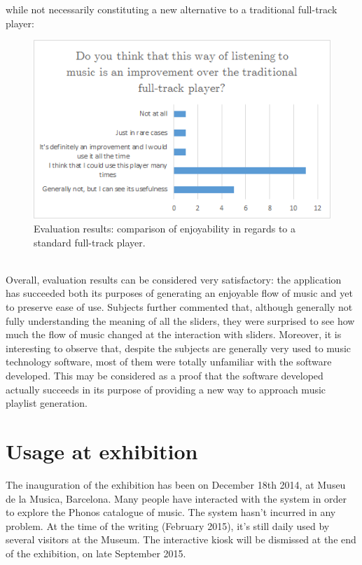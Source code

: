 while not necessarily constituting a new alternative to a traditional full-track player: \\
\begin{figure}[h]
\begin{center}
\includegraphics[scale=0.5]{Figures/improvement.png}
  \caption[Evaluation results: comparison of enjoyability in regards to a standard full-track player]{Evaluation results: comparison of enjoyability in regards to a standard full-track player.}
\end{center}
\end{figure}
\\

Overall, evaluation results can be considered very satisfactory: the application has succeeded both its purposes of generating an enjoyable flow of music and yet to preserve ease of use. Subjects further commented that, although generally not fully understanding the meaning of all the sliders, they were surprised to see how much the flow of music changed at the interaction with sliders. Moreover, it is interesting to observe that, despite the subjects are generally very used to music technology software, most of them were totally unfamiliar with the software developed. This may be considered as a proof that the software developed actually succeeds in its purpose of providing a new way to approach music playlist generation.

\section{Usage at exhibition} 
The inauguration of the exhibition has been on December 18th 2014, at Museu de la Musica, Barcelona. Many people have interacted with the system in order to explore the Phonos catalogue of music. The system hasn't incurred in any problem. At the time of the writing (February 2015), it's still daily used by several visitors at the Museum. The interactive kiosk will be dismissed at the end of the exhibition, on late September 2015.\\

